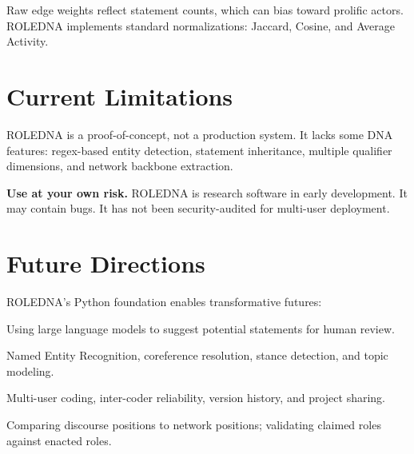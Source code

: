 \documentclass[../main.tex]{subfiles}
\begin{document}
Raw edge weights reflect statement counts, which can bias toward prolific actors. ROLEDNA implements standard normalizations: Jaccard, Cosine, and Average Activity.


\section*{Current Limitations}

ROLEDNA is a proof-of-concept, not a production system. It lacks some DNA features: regex-based entity detection, statement inheritance, multiple qualifier dimensions, and network backbone extraction.

\begin{importantbox}
\textbf{Use at your own risk.} ROLEDNA is research software in early development. It may contain bugs. It has not been security-audited for multi-user deployment.
\end{importantbox}


\section*{Future Directions}

ROLEDNA's Python foundation enables transformative futures:

\begin{description}[leftmargin=0.5cm, itemsep=0.3em]
\item[LLM-Assisted Coding] Using large language models to suggest potential statements for human review.

\item[NLP Pipeline Integration] Named Entity Recognition, coreference resolution, stance detection, and topic modeling.

\item[Collaborative Features] Multi-user coding, inter-coder reliability, version history, and project sharing.

\item[Integration with RoleBox] Comparing discourse positions to network positions; validating claimed roles against enacted roles.
\end{description}
\end{document}
